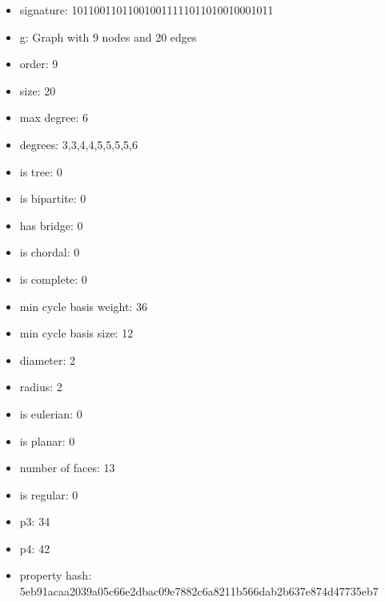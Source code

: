 \newpage
\begin{figure}
\end{figure}
\begin{itemize}
\item signature: 101100110110010011111011010010001011
\item g: Graph with 9 nodes and 20 edges
\item order: 9
\item size: 20
\item max degree: 6
\item degrees: 3,3,4,4,5,5,5,5,6
\item is tree: 0
\item is bipartite: 0
\item has bridge: 0
\item is chordal: 0
\item is complete: 0
\item min cycle basis weight: 36
\item min cycle basis size: 12
\item diameter: 2
\item radius: 2
\item is eulerian: 0
\item is planar: 0
\item number of faces: 13
\item is regular: 0
\item p3: 34
\item p4: 42
\item property hash: 5eb91acaa2039a05c66e2dbac09e7882c6a8211b566dab2b637e874d47735eb7
\end{itemize}
